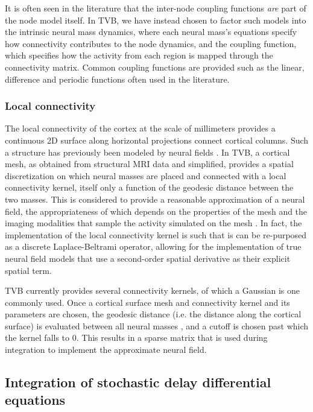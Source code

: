\documentclass{bioinfo}
\begin{document}
	It is often seen in the literature that the inter-node coupling functions
	\textit{are} part of the node model itself. In TVB, we have instead 
	chosen to factor such models into the intrinsic neural mass dynamics, where each 
	neural mass's equations specify how connectivity contributes to the
	node dynamics, and the coupling function, which specifies how the activity
	from each region is mapped through the connectivity matrix. Common coupling 
	functions are provided such as the linear, difference and periodic functions
	often used in the literature.

	\subsubsection{Local connectivity}

	The local connectivity of the cortex at the scale of millimeters provides
	a continuous 2D surface along horizontal projections connect 
	cortical columns. Such a structure has previously been modeled by
	neural fields \citep{Amari_1977, Jirsa_1997, Liley_1999}. In TVB, a cortical mesh, 
	as obtained from structural MRI data and simplified, provides a spatial 
	discretization on which neural masses are placed and connected with a
	local connectivity kernel, itself only a function of the geodesic distance
	between the two masses. This is considered to provide a reasonable
	approximation of a neural field, the appropriateness of which depends on the properties
	of the mesh and the imaging modalities that sample the activity simulated
	on the mesh \citep{Spiegler_2013}. In fact,
	the implementation of the local connectivity kernel is such
	that is can be re-purposed as a discrete Laplace-Beltrami operator,
	allowing for the implementation of true neural field models that 
	use a second-order spatial derivative as their explicit spatial term.

	TVB currently provides several connectivity kernels, of which a Gaussian
	is one commonly used. Once a cortical surface mesh 
	and connectivity kernel and its parameters are chosen, the geodesic
	distance (i.e. the distance along the cortical surface) is evaluated
	between all neural masses \citep{Mitchell1987}, and a cutoff is chosen
	past which the kernel falls to 0. This results in a sparse matrix that 
	is used during integration to implement the approximate neural field. 

\subsection{Integration of stochastic delay differential equations}
\end{document}
